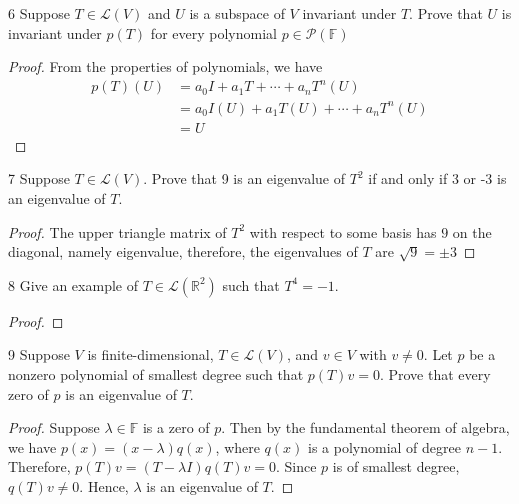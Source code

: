 \documentclass{article}
\newenvironment{problem}[1]{\begin{prob*}{#1}{}}{\end{prob*}}
\begin{document}
\begin{problem}{6}
Suppose $T \in \mathcal{L}(V)$ and $U$ is a subspace of $V$ invariant under $T$. Prove that $U$ is invariant under $p(T)$ for every polynomial $p \in \mathcal{P}(\mathbb{F})$
\end{problem}
\begin{proof}
	From the properties of polynomials, we have
	\begin{equation*}
		\begin{aligned}
			p(T)(U) & = a_0I + a_1T + \cdots + a_nT^{n}(U)       \\
			        & = a_0I(U) + a_1T(U) + \cdots + a_nT^{n}(U) \\
			        & = U
		\end{aligned}
	\end{equation*}
\end{proof}

\begin{problem}{7}
Suppose $T \in \mathcal{L}(V)$. Prove that 9 is an eigenvalue of $T^{2}$ if and only if 3 or -3 is an
eigenvalue of $T$.
\end{problem}
\begin{proof}
	The upper triangle matrix of $T^{2}$ with respect to
	some basis has $9$ on the diagonal, namely eigenvalue,
	therefore, the eigenvalues of $T$ are $\sqrt{9} = \pm 3$
\end{proof}

\begin{problem}{8}
Give an example of $T \in \mathcal{L}(\mathbb{R}^{2})$
such that $T^{4} = -1$.
\end{problem}
\begin{proof}
	\begin{comment}
	TODO: 5.B.8 Pending. Give an example.
	\end{comment}
\end{proof}

\newpage
\begin{problem}{9}
Suppose $V$ is finite-dimensional, $T \in \mathcal{L}(V)$, and $v \in V$ with $v \neq  0$. Let $p$ be a nonzero polynomial of smallest degree such that $p(T)v = 0$. Prove that every zero of $p$ is an eigenvalue of $T$.
\end{problem}
\begin{proof}
	Suppose $\lambda \in \mathbb{F}$ is a zero of $p$. Then by the fundamental theorem of algebra, we have $p(x) = (x - \lambda)q(x)$, where $q(x)$ is a polynomial of degree $n - 1$. Therefore, $p(T)v = (T - \lambda I)q(T)v = 0$. Since $p$ is of smallest degree, $q(T)v \neq 0$. Hence, $\lambda$ is an eigenvalue of $T$.
\end{proof}
\end{document}
